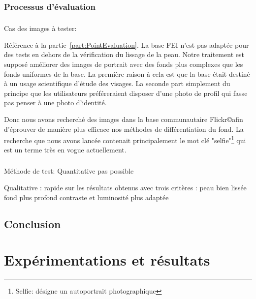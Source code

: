 \documentclass[11pt, french]{report-rd-info}
\begin{document}
\subsection{Processus d'évaluation}



\paragraph*{}Cas des images à tester: 

Référence à la partie~\ref{part:PointEvaluation}.
La base FEI n'est pas adaptée pour des tests en dehors de la vérification du lissage de la peau.
Notre traitement est supposé améliorer des images de portrait avec des fonds plus complexes que les fonds uniformes de la base. La première raison à cela est que la base était destiné à un usage scientifique d'étude des visages. La seconde part simplement du principe que les utilisateurs préféreraient disposer d'une photo de profil qui fasse pas penser à une photo d'identité.

Donc nous avons recherché des images dans la base communautaire Flickr\copyright afin d'éprouver de manière plus efficace nos méthodes de différentiation du fond. La recherche que nous avons lancée contenait principalement le mot clé "selfie"\footnote{Selfie: désigne un autoportrait photographique} qui est un terme très en vogue actuellement.


\paragraph*{}
Méthode de test:
Quantitative pas possible

Qualitative : rapide sur les résultats obtenus avec trois critères : 
peau bien lissée
fond plus profond
contraste et luminosité plus adaptée





\section{Conclusion}









\chapter{Expérimentations et résultats}
\label{chap:Experimentations}
\end{document}
